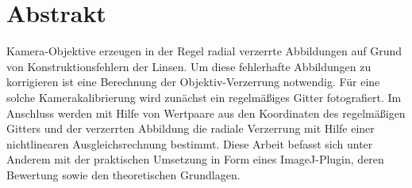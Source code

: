 \section{Abstrakt}
\label{sec:Abstrakt}
Kamera-Objektive erzeugen in der Regel radial verzerrte Abbildungen auf Grund von Konstruktionsfehlern der Linsen. Um diese fehlerhafte Abbildungen zu korrigieren ist eine Berechnung der Objektiv-Verzerrung notwendig. Für eine solche Kamerakalibrierung wird zunächst ein regelmäßiges Gitter fotografiert. Im Anschluss werden mit Hilfe von Wertpaare aus den Koordinaten des regelmäßigen Gitters und der verzerrten Abbildung die radiale Verzerrung mit Hilfe einer nichtlinearen Ausgleichsrechnung bestimmt. Diese Arbeit befasst sich unter Anderem mit der praktischen Umsetzung in Form eines ImageJ-Plugin, deren Bewertung sowie den theoretischen Grundlagen.  





